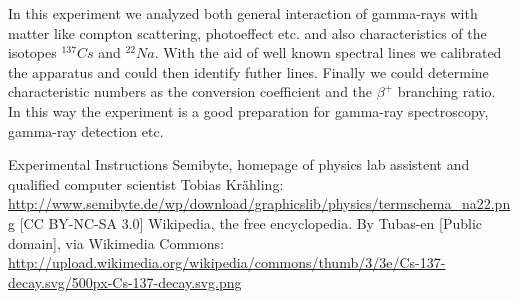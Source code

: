 \documentclass[bigchapter,colorback,accentcolor=tud4b,linedtoc,11pt]{tudreport}
\begin{document}
In this experiment we analyzed both general interaction of gamma-rays with
matter like compton scattering, photoeffect etc. and also characteristics of the
isotopes $^{137}Cs$ and $^{22}Na$. With the aid of well known spectral lines we
calibrated the apparatus and could then identify futher lines. Finally we could
determine characteristic numbers as the conversion coefficient and the $\beta^+$
branching ratio. In this way the experiment is a good preparation for gamma-ray
spectroscopy, gamma-ray detection etc.

\cleardoublepage{}
\newpage
\begin{thebibliography}{100}
   {Experimental Instructions}  {Semibyte, homepage of physics lab assistent and qualified
      computer scientist Tobias Krähling:
      \url{http://www.semibyte.de/wp/download/graphicslib/physics/termschema_na22.png}
    [CC BY-NC-SA 3.0]}
   {Wikipedia, the free encyclopedia. By Tubas-en [Public
      domain], via Wikimedia Commons: \url{http://upload.wikimedia.org/wikipedia/commons/thumb/3/3e/Cs-137-decay.svg/500px-Cs-137-decay.svg.png}}
\end{thebibliography}
\end{document}
